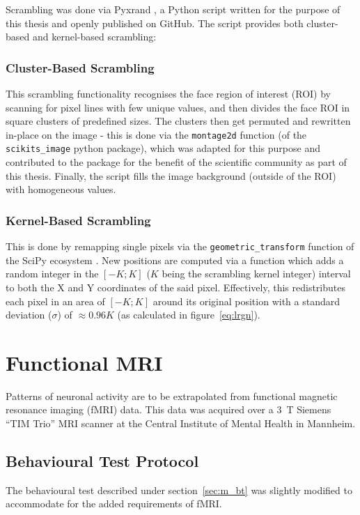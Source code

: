 	    Scrambling was done via Pyxrand \citep{pyxrand}, a Python script written for the purpose of this thesis and openly published on GitHub.
	    The script provides both cluster-based and kernel-based scrambling:
	    \subsubsection{Cluster-Based Scrambling}
		This scrambling functionality recognises the face region of interest (ROI) by scanning for pixel lines with few unique values, and then divides the face ROI in square clusters of predefined sizes.
		The clusters then get permuted and rewritten in-place on the image - this is done via the \colorbox{vlg}{\texttt{montage2d}} function (of the \colorbox{vlg}{\texttt{scikits\_image}} python package), which  was adapted for this purpose and contributed to the package for the benefit of the scientific community as part of this thesis.
		Finally, the script fills the image background (outside of the ROI) with homogeneous values.
	    \subsubsection{Kernel-Based Scrambling}\label{sec:m_vs_si_kbs}
		This is done by remapping single pixels via the \colorbox{vlg}{\texttt{geometric\_transform}} function of the SciPy ecosystem \citep{scipy,Oliphant2007}.
		New positions are computed via a function which adds a random integer in the $[-K;K]$ ($K$ being the scrambling kernel integer) interval to both the X and Y coordinates of the said pixel.
		Effectively, this redistributes each pixel in an area of $[-K;K]$ around its original position with a standard deviation ($\sigma$) of $\approx 0.96K$ (as calculated in figure~\ref{eq:lrgn}).
    \section{Functional MRI}\label{sec:m_fmri}
	Patterns of neuronal activity are to be extrapolated from functional magnetic resonance imaging (fMRI) data.
	This data was acquired over a \SI{3}{\tesla} Siemens “TIM Trio” MRI scanner at the Central Institute of Mental Health in Mannheim.
	\subsection{Behavioural Test Protocol}
	    The behavioural test described under section~\ref{sec:m_bt} was slightly modified to accommodate for the added requirements of fMRI.
	    
